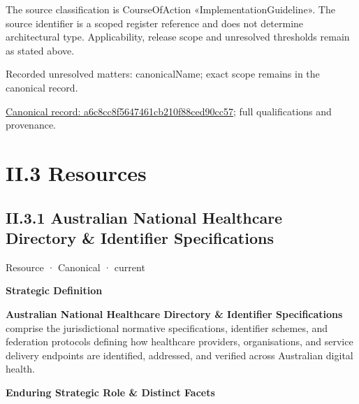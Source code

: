 The source classification is CourseOfAction «ImplementationGuideline». The source identifier is a scoped register reference and does not determine architectural type. Applicability, release scope and unresolved thresholds remain as stated above.


{\small Recorded unresolved matters: canonicalName; exact scope remains in the canonical record.}\par
{\footnotesize \href{../../../../continuum/strategy/course-of-action/implementation-guideline/a6c8cc8f5647461cb210f88ced90cc57.md}{Canonical record: a6c8cc8f5647461cb210f88ced90cc57}; full qualifications and provenance.}\par
\chapter*{II.3 Resources}
\label{navigation:II.3}

\section*{II.3.1 Australian National Healthcare Directory \& Identifier Specifications}
\label{navigation:II.3.1}

\label{element:eac71c56624d43bda2b9d3648f14603a}
{\small Resource · Canonical · current}\par

\par\medskip\textbf{Strategic Definition}\par


\textbf{Australian National Healthcare Directory \& Identifier Specifications} comprise the jurisdictional normative specifications, identifier schemes, and federation protocols defining how healthcare providers, organisations, and service delivery endpoints are identified, addressed, and verified across Australian digital health.



\par\medskip\textbf{Enduring Strategic Role \& Distinct Facets}\par


